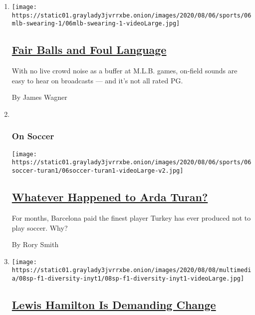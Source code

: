 \begin{enumerate}
\def\labelenumi{\arabic{enumi}.}
\item
  \texttt{[image: https://static01.graylady3jvrrxbe.onion/images/2020/08/06/sports/06mlb-swearing-1/06mlb-swearing-1-videoLarge.jpg]}

  \hypertarget{fair-balls-and-foul-language}{%
  \subsection{\texorpdfstring{\href{/2020/08/06/sports/baseball/mlb-swearing.html}{Fair
  Balls and Foul
  Language}}{Fair Balls and Foul Language}}\label{fair-balls-and-foul-language}}

  With no live crowd noise as a buffer at M.L.B. games, on-field sounds
  are easy to hear on broadcasts --- and it's not all rated PG.

  By James Wagner
\item ~
  \hypertarget{on-soccer}{%
  \subsubsection{On Soccer}\label{on-soccer}}

  \texttt{[image: https://static01.graylady3jvrrxbe.onion/images/2020/08/06/sports/06soccer-turan1/06soccer-turan1-videoLarge-v2.jpg]}

  \hypertarget{whatever-happened-to-arda-turan}{%
  \subsection{\texorpdfstring{\href{/2020/08/06/sports/soccer/arda-turan-galatasaray-barcelona.html}{Whatever
  Happened to Arda
  Turan?}}{Whatever Happened to Arda Turan?}}\label{whatever-happened-to-arda-turan}}

  For months, Barcelona paid the finest player Turkey has ever produced
  not to play soccer. Why?

  By Rory Smith
\item
  \texttt{[image: https://static01.graylady3jvrrxbe.onion/images/2020/08/08/multimedia/08sp-f1-diversity-inyt1/08sp-f1-diversity-inyt1-videoLarge.jpg]}

  \hypertarget{lewis-hamilton-is-demanding-change}{%
  \subsection{\texorpdfstring{\href{/2020/08/07/sports/autoracing/lewis-hamilton-formula-1-diversity.html}{Lewis
  Hamilton Is Demanding
  Change}}{Lewis Hamilton Is Demanding Change}}\label{lewis-hamilton-is-demanding-change}}


\end{enumerate}
